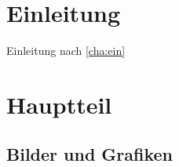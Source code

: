 \newcommand{\lang}{ngerman}


     

\maketitle

\pagestyle{scrplain}
\cleardoubleemptypage 
{}
\tableofcontents
\newpage
\listoffigures
\newpage
\listoftables
\newpage
\listofalgorithms
\newpage

\usetwonomenclatures
\printnomenclature

\cleardoubleemptypage
\pagestyle{scrheadings}
\setcounter{page}{1}
\chapter{Einleitung}\label{cha:ein}
Einleitung nach \autoref{cha:ein}

\chapter{Hauptteil}\label{cha:haupt}
\section{Bilder und Grafiken}\label{sec:grafiken}
